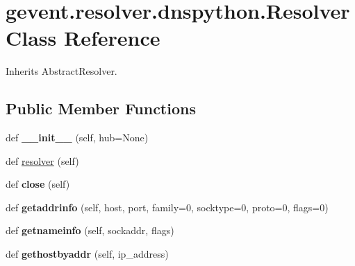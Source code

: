 \hypertarget{classgevent_1_1resolver_1_1dnspython_1_1_resolver}{}\section{gevent.\+resolver.\+dnspython.\+Resolver Class Reference}
\label{classgevent_1_1resolver_1_1dnspython_1_1_resolver}


Inherits Abstract\+Resolver.

\subsection*{Public Member Functions}
\begin{DoxyCompactItemize}
\item 
\mbox{\label{classgevent_1_1resolver_1_1dnspython_1_1_resolver_ae3cd73f573ab2850b73f82a794ed96b5}} 
def {\bfseries \+\_\+\+\_\+init\+\_\+\+\_\+} (self, hub=None)
\item 
def \hyperlink{classgevent_1_1resolver_1_1dnspython_1_1_resolver_a2d9f5e7cece604fbc7df0261444c0e72}{resolver} (self)
\item 
\mbox{\label{classgevent_1_1resolver_1_1dnspython_1_1_resolver_a3ff353d8a078f374426c2e37d89382a1}} 
def {\bfseries close} (self)
\item 
\mbox{\label{classgevent_1_1resolver_1_1dnspython_1_1_resolver_a790a07a1cf6d8fb46c04e7e53eac9968}} 
def {\bfseries getaddrinfo} (self, host, port, family=0, socktype=0, proto=0, flags=0)
\item 
\mbox{\label{classgevent_1_1resolver_1_1dnspython_1_1_resolver_abdffa7b82ee168e313e7f88a71943cc5}} 
def {\bfseries getnameinfo} (self, sockaddr, flags)
\item 
\mbox{\label{classgevent_1_1resolver_1_1dnspython_1_1_resolver_adbf5242ee498d257f5ad0af9e803d9e3}} 
def {\bfseries gethostbyaddr} (self, ip\+\_\+address)
\end{DoxyCompactItemize}



